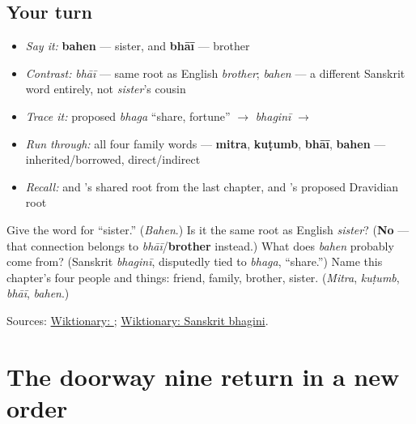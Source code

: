 \subsection*{Your turn}
\begin{itemize}
\raggedright
  \item \emph{Say it:} \textbf{bahen} — sister, and \textbf{bhāī} — brother
  \item \emph{Contrast:} \emph{bhāī} — same root as English \emph{brother}; \emph{bahen} — a different Sanskrit word entirely, not \emph{sister}'s cousin
  \item \emph{Trace it:} proposed \emph{bhaga} \textquotedblleft{}share, fortune\textquotedblright{} $\to$ \emph{bhaginī} $\to$ \textbf{}
  \item \emph{Run through:} all four family words — \textbf{mitra}, \textbf{kuṭumb}, \textbf{bhāī}, \textbf{bahen} — inherited/borrowed, direct/indirect
  \item \emph{Recall:} \textbf{} and \textbf{}'s shared root from the last chapter, and \textbf{}'s proposed Dravidian root
\end{itemize}

\begin{tcolorbox}[breakable,colback=teal!4,colframe=teal!35!black,title={Before you move on}]
Give the word for \textquotedblleft{}sister.\textquotedblright{} (\emph{Bahen}.) Is it the same root as English \emph{sister}? (\textbf{No} — that connection belongs to \emph{bhāī}/\textbf{brother} instead.) What does \emph{bahen} probably come from? (Sanskrit \emph{bhaginī}, disputedly tied to \emph{bhaga}, \textquotedblleft{}share.\textquotedblright{}) Name this chapter's four people and things: friend, family, brother, sister. (\emph{Mitra}, \emph{kuṭumb}, \emph{bhāī}, \emph{bahen}.)

Sources: \href{https://en.wiktionary.org/wiki/\%E0\%AA\%AC\%E0\%AA\%B9\%E0\%AB\%87\%E0\%AA\%A8}{Wiktionary: }; \href{https://en.wiktionary.org/wiki/\%E0\%A4\%AD\%E0\%A4\%97\%E0\%A4\%BF\%E0\%A4\%A8\%E0\%A5\%80}{Wiktionary: Sanskrit bhagini}.
\end{tcolorbox}
\section[\texorpdfstring{\gu{ણ} \gu{જ} \gu{ુ} \gu{શ} \gu{ં} \gu{ક} \gu{ો} \gu{છ} \gu{ી} (retroflex nna …)}{ણ જ ુ શ ં ક ો છ ી (retroflex nna …)}]{The doorway nine return in a new order}

\label{lesson:GU-R13-doorway-nine-r3}



